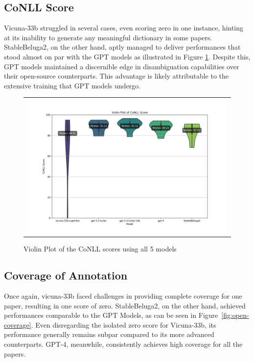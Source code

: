 \subsection{CoNLL Score}

Vicuna-33b struggled in several cases, even scoring zero in one instance, hinting at its inability to generate any meaningful dictionary in some papers. StableBeluga2, on the other hand, aptly managed to deliver performances that stood almost on par with the GPT models as illustrated in Figure \ref{fig:open-source-conll}. Despite this, GPT models maintained a discernible edge in disambiguation capabilities over their open-source counterparts. This advantage is likely attributable to the extensive training that GPT models undergo.

\begin{figure}[htpb]
  \centering
  \begin{tabular}{c}
  \includegraphics[width=14cm]{images/open-conll-score.png}
  \end{tabular}
  \caption[CoNLL Score Open Source]{Violin Plot of the CoNLL scores using all 5 models}\label{fig:open-source-conll}
\end{figure}

\subsection{Coverage of Annotation}

Once again, vicuna-33b faced challenges in providing complete coverage for one paper, resulting in one score of zero. StableBeluga2, on the other hand, achieved performances comparable to the GPT Models, as can be seen in Figure~\ref{fig:open-coverage}. Even disregarding the isolated zero score for Vicuna-33b, its performance generally remains subpar compared to its more advanced counterparts. GPT-4, meanwhile, consistently achieves high coverage for all the papers.

